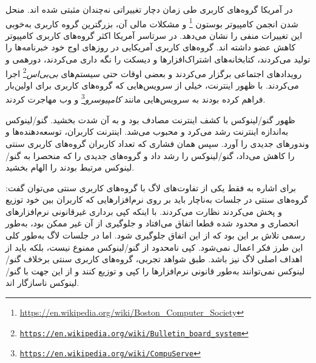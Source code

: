 در آمریکا گروه‌های کاربری طی زمان دچار تغییراتی نه‌چندان مثبتی شده اند.
منحل شدن انجمن کامپیوتر بوستون
\footnote{\url{https://en.wikipedia.org/wiki/Boston_Computer_Society}}
و مشکلات مالی آن، بزرگترین گروه کاربری به‌خوبی این تغییرات منفی را نشان می‌دهد.
در سرتاسر آمریکا اکثر گروه‌های کاربری کامپیوتر کاهش عضو داشته اند.
گروه‌های کاربری آمریکایی در روزهای اوج خود خبرنامه‌ها را تولید می‌کردند،
کتابخانه‌های اشتراک‌افزارها و دیسکت را نگه داری می‌کردند،
دورهمی و رویدادهای اجتماعی برگزار می‌کردند و
بعضی اوقات حتی سیستم‌های
\emph{بی‌بی‌اس}\footnote{\texttt{\url{https://en.wikipedia.org/wiki/Bulletin_board_system}}}
اجرا می‌کردند. با ظهور اینترنت، خیلی از سرویس‌هایی که گروه‌های کاربری
برای اولین‌بار فراهم کرده بودند به سرویس‌هایی مانند
\emph{کامپیوسرو}\footnote{\texttt{\url{https://en.wikipedia.org/wiki/CompuServe}}}
و وب مهاجرت کردند.

ظهور گنو/لینوکس با کشف اینترنت مصادف بود و به آن شدت بخشید.
گنو/لینوکس به‌اندازه اینترنت رشد می‌کرد و محبوب می‌شد.
اینترنت کاربران، توسعه‌دهنده‌ها و وندورهای جدیدی را آورد.
سپس همان فشاری که تعداد کاربران گروه‌های کاربری سنتی را کاهش می‌داد،
گنو/لینوکس را رشد داد و گروه‌های جدیدی را که منحصرا به گنو/لینوکس مرتبط بودند
را الهام بخشید.

برای اشاره به فقط یکی از تفاوت‌های لاگ با گروه‌های کاربری سنتی می‌توان گفت:
گروه‌های سنتی در جلسات به‌ناچار باید بر روی نرم‌افزارهایی که کاربران بین خود
توزیع و پخش می‌کردند نظارت می‌کردند. با اینکه کپی برداری غیرقانونی نرم‌افزارهای
انحصاری و محدود شده قطعا اتفاق می‌افتاد و جلوگیری از آن غیر ممکن بود، به‌طور رسمی
تلاش بر این بود که از این اتفاق جلوگیری شود.
اما در جلسات لاگ به‌طور کلی این طرز فکر اعمال نمی‌شود. کپی نامحدود از گنو/لینوکس ممنوع نیست،
بلکه باید از اهداف اصلی لاگ نیز باشد. طبق شواهد تجربی، گروه‌های کاربری سنتی برخلاف گنو/لینوکس
نمی‌توانند به‌طور قانونی نرم‌افزار‌ها را کپی و توزیع کنند و از این جهت با گنو/لینوکس ناسازگار اند.

